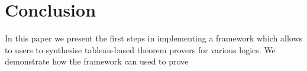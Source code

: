 \documentclass{llncs}
\begin{document}
\section{Conclusion}
%
In this paper we present the first steps in implementing a framework which
allows to users to synthesise tableau-based theorem provers for various logics.
We demonstrate how the framework can used to prove 
%


%
\end{document}
